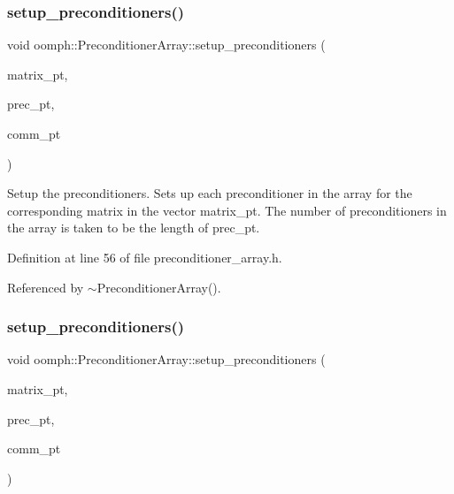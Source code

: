 \subsubsection{\texorpdfstring{setup\+\_\+preconditioners()}{setup\_preconditioners()}\hspace{0.1cm}{\footnotesize\ttfamily [1/2]}}
{\footnotesize\ttfamily void oomph\+::\+Preconditioner\+Array\+::setup\+\_\+preconditioners (\begin{DoxyParamCaption}\item[{\hyperlink{classoomph_1_1Vector}{Vector}$<$ \hyperlink{classoomph_1_1CRDoubleMatrix}{C\+R\+Double\+Matrix} $\ast$$>$}]{matrix\+\_\+pt,  }\item[{\hyperlink{classoomph_1_1Vector}{Vector}$<$ \hyperlink{classoomph_1_1Preconditioner}{Preconditioner} $\ast$$>$}]{prec\+\_\+pt,  }\item[{const \hyperlink{classoomph_1_1OomphCommunicator}{Oomph\+Communicator} $\ast$}]{comm\+\_\+pt }\end{DoxyParamCaption})\hspace{0.3cm}{\ttfamily [inline]}}

Setup the preconditioners. Sets up each preconditioner in the array for the corresponding matrix in the vector matrix\+\_\+pt. The number of preconditioners in the array is taken to be the length of prec\+\_\+pt. 

Definition at line 56 of file preconditioner\+\_\+array.\+h.



Referenced by $\sim$\+Preconditioner\+Array().

\mbox{\label{classoomph_1_1PreconditionerArray_ac575b5a9fe045dcba7e42aa0c445a7ee}} 
\subsubsection{\texorpdfstring{setup\+\_\+preconditioners()}{setup\_preconditioners()}\hspace{0.1cm}{\footnotesize\ttfamily [2/2]}}
{\footnotesize\ttfamily void oomph\+::\+Preconditioner\+Array\+::setup\+\_\+preconditioners (\begin{DoxyParamCaption}\item[{\hyperlink{classoomph_1_1Vector}{Vector}$<$ \hyperlink{classoomph_1_1CRDoubleMatrix}{C\+R\+Double\+Matrix} $\ast$$>$}]{matrix\+\_\+pt,  }\item[{\hyperlink{classoomph_1_1Vector}{Vector}$<$ \hyperlink{classoomph_1_1Preconditioner}{Preconditioner} $\ast$$>$}]{prec\+\_\+pt,  }\item[{const \hyperlink{classoomph_1_1OomphCommunicator}{Oomph\+Communicator} $\ast$}]{comm\+\_\+pt }\end{DoxyParamCaption})}



